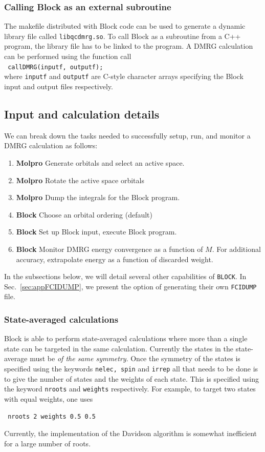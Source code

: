 \documentclass[letterpaper,12pt,aps, pra]{revtex4-1}
\begin{document}
\subsubsection{Calling Block as an external subroutine}
The makefile distributed with Block code can be used to generate a dynamic library file called \texttt{libqcdmrg.so}. To call Block as a subroutine from a C++ program, the library file has to be linked to the program. A DMRG calculation can be performed using the function call\\
\texttt{
callDMRG(inputf, outputf);\\
} 
where \texttt{inputf} and \texttt{outputf} are C-style character arrays specifying the Block input and output files respectively.

\subsection{Input and calculation details}
\label{sec:appDetails}
We can break down the tasks needed to successfully setup, run, and monitor a DMRG calculation as follows:
\begin{enumerate}
\item {\bf Molpro} Generate orbitals and select an active space. 
\item {\bf Molpro} Rotate the active space orbitals
\item {\bf Molpro} Dump the integrals for the Block program.
\item {\bf Block} Choose an orbital ordering (default)
\item {\bf Block} Set up Block input, execute Block program.
\item {\bf Block} Monitor DMRG energy convergence as a function of $M$. For additional accuracy, extrapolate energy as a function of discarded weight. 
\end{enumerate}
In the subsections below, we will detail several other capabilities of
\texttt{BLOCK}. In Sec.~\ref{sec:appFCIDUMP}, we present the option of
generating their own \texttt{FCIDUMP} file.

\subsubsection{State-averaged calculations}
Block is able to perform state-averaged calculations where more than a single
state can be targeted in the same calculation. Currently the states in the
state-average must be \emph{of the same symmetry}. Once the symmetry of the
states is specified using the keywords \texttt{nelec, spin} and \texttt{irrep}
all that needs to be done is to give the number of states and the weights of
each state. This is specified using the keyword \texttt{nroots} and
\texttt{weights} respectively. For example, to target two states with equal
weights, one uses \begin{verbatim} nroots 2 weights 0.5 0.5 \end{verbatim}
Currently, the implementation of the Davidson algorithm is somewhat inefficient
for a large number of roots.
\end{document}
